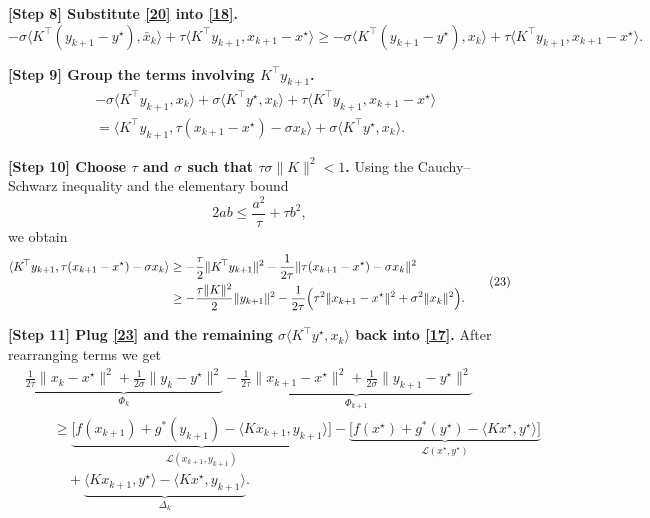 \documentclass{article}
\newcommand{\inner}[2]{\langle #1,#2\rangle}
\newcommand{\norm}[1]{\|#1\|}
\begin{document}
\noindent\textbf{[Step 8] Substitute \eqref{20} into \eqref{18}.}
\[
-\sigma\inner{K^{\!\top}(y_{k+1}-y^{\star})}{\bar x_{k}}
   +\tau\inner{K^{\!\top}y_{k+1}}{x_{k+1}-x^{\star}}
\ge
-\sigma\inner{K^{\!\top}(y_{k+1}-y^{\star})}{x_{k}}
   +\tau\inner{K^{\!\top}y_{k+1}}{x_{k+1}-x^{\star}} .
\tag{21}
\]

\noindent\textbf{[Step 9] Group the terms involving $K^{\!\top}y_{k+1}$.}
\[
\begin{aligned}
&-\sigma\inner{K^{\!\top}y_{k+1}}{x_{k}}
   +\sigma\inner{K^{\!\top}y^{\star}}{x_{k}}
   +\tau\inner{K^{\!\top}y_{k+1}}{x_{k+1}-x^{\star}}\\
&= \inner{K^{\!\top}y_{k+1}}{\tau (x_{k+1}-x^{\star})-\sigma x_{k}}
   +\sigma\inner{K^{\!\top}y^{\star}}{x_{k}} .
\end{aligned}
\tag{22}
\]

\noindent\textbf{[Step 10] Choose $\tau$ and $\sigma$ such that
$\tau\sigma\|K\|^{2}<1$.}
Using the Cauchy–Schwarz inequality and the elementary bound
\[
2ab\le \frac{a^{2}}{\tau}+ \tau b^{2},
\]
we obtain
\[
\begin{aligned}
\inner{K^{\!\top}y_{k+1}}{\tau (x_{k+1}-x^{\star})-\sigma x_{k}}
&\ge
-\frac{\tau}{2}\norm{K^{\!\top}y_{k+1}}^{2}
-\frac{1}{2\tau}\norm{\tau (x_{k+1}-x^{\star})-\sigma x_{k}}^{2}\\
&\ge
-\frac{\tau\|K\|^{2}}{2}\norm{y_{k+1}}^{2}
-\frac{1}{2\tau}\Bigl(\tau^{2}\norm{x_{k+1}-x^{\star}}^{2}
+\sigma^{2}\norm{x_{k}}^{2}\Bigr).
\end{aligned}
\tag{23}
\]

\noindent\textbf{[Step 11] Plug \eqref{23} and the remaining $\sigma\inner{K^{\!\top}y^{\star}}{x_{k}}$ back into \eqref{17}.}  
After rearranging terms we get
\[
\begin{aligned}
&\underbrace{\frac{1}{2\tau}\norm{x_{k}-x^{\star}}^{2}
            +\frac{1}{2\sigma}\norm{y_{k}-y^{\star}}^{2}}_{\Phi_{k}}
-\underbrace{\frac{1}{2\tau}\norm{x_{k+1}-x^{\star}}^{2}
            +\frac{1}{2\sigma}\norm{y_{k+1}-y^{\star}}^{2}}_{\Phi_{k+1}} \\
&\qquad \ge
   \underbrace{\bigl[f(x_{k+1})+g^{*}(y_{k+1}) -\inner{Kx_{k+1}}{y_{k+1}}\bigr]}_{\mathcal L(x_{k+1},y_{k+1})}
   -\underbrace{\bigl[f(x^{\star})+g^{*}(y^{\star})-\inner{Kx^{\star}}{y^{\star}}\bigr]}_{\mathcal L(x^{\star},y^{\star})}
   \\
&\qquad\quad
   +\underbrace{\inner{Kx_{k+1}}{y^{\star}}-\inner{Kx^{\star}}{y_{k+1}}}_{\Delta_{k}}.
\end{aligned}
\tag{24}
\]
\end{document}
